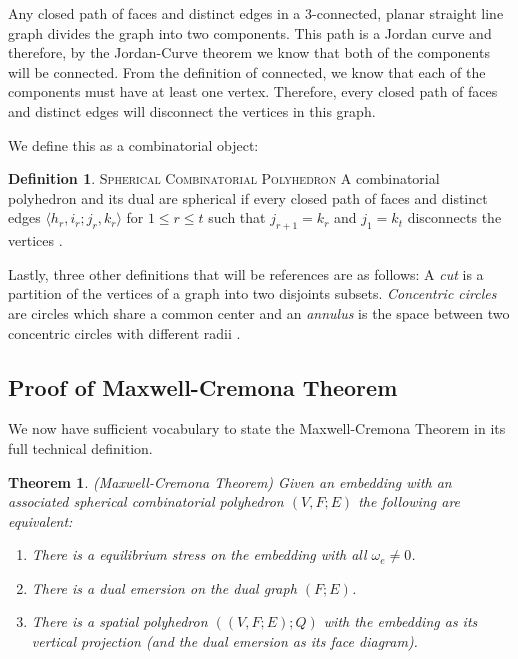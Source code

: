 \documentclass[11pt]{article}
\newtheorem{theorem}{Theorem}[section]
\theoremstyle{definition}
\newtheorem{definition}{Definition}[section]
\begin{document}
	Any closed path of faces and distinct edges in a 3-connected, planar straight line graph divides the graph into two components.
	This path is a Jordan curve and therefore, by the Jordan-Curve theorem we know that both of the components will be connected. 
	From the definition of connected, we know that each of the components must have at least one vertex.
	Therefore, every closed path of faces and distinct edges will disconnect the vertices in this graph.
	
	We define this as a combinatorial object:
	
	\theoremstyle{definition}
	\begin{definition}{\textsc{Spherical Combinatorial Polyhedron}}
		A combinatorial polyhedron and its dual are spherical if every closed path of faces and distinct edges $\langle h_r,i_r;j_r,k_r \rangle$ for $1 \leq r \leq t$ such that $j_{r+1} = k_r$ and $j_1 = k_t$ disconnects the vertices \cite{mccProof}.
	\end{definition}
		
	Lastly, three other definitions that will be references are as follows:
	A \emph{cut} is a partition of the vertices of a graph into two disjoints subsets. 
	\emph{Concentric circles} are circles which share a common center and an \emph{annulus} is the space between two concentric circles with different radii \cite{mathworld:ConcentricCircles}.
	
\subsection{Proof of Maxwell-Cremona Theorem}
	We now have sufficient vocabulary to state the Maxwell-Cremona Theorem in its full technical definition.
	
	\begin{theorem}{(Maxwell-Cremona Theorem)} 
	Given an embedding with an associated spherical combinatorial polyhedron $(V,F;E)$ the following are equivalent:
		\begin{enumerate}
			\item There is a equilibrium stress on the embedding with all $\omega_e \neq 0$.
			\item There is a dual emersion on the dual graph $(F;E)$.
			\item There is a spatial polyhedron $((V,F;E);Q)$ with the embedding as its vertical projection (and the dual emersion as its face diagram).
 		\end{enumerate}
	\end{theorem}
	
\end{document}
